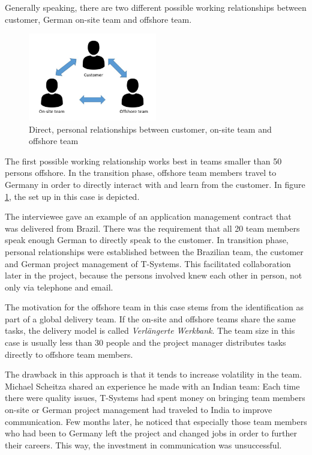 Generally speaking, there are two different possible working relationships between customer, German on-site team and offshore team. %

\vspace{3mm}
\begin{figure}[htbp]
	\centering
	\includegraphics[width=0.5\textwidth]{Pictures/1on1_relationship}
	\caption{Direct, personal relationships between customer, on-site team and offshore team}
	\label{fig:1on1}
\end{figure}

The first possible working relationship works best in teams smaller than 50 persons offshore. In the transition phase, offshore team members travel to Germany in order to directly interact with and learn from the customer. In figure \ref{fig:1on1}, the set up in this case is depicted.

The interviewee gave an example of an application management contract that was delivered from Brazil. There was the requirement that all 20 team members speak enough German to directly speak to the customer. In transition phase, personal relationships were established between the Brazilian team, the customer and German project management of T-Systems. This facilitated collaboration later in the project, because the persons involved knew each other in person, not only via telephone and email.

The motivation for the offshore team in this case stems from the identification as part of a global delivery team. If the on-site and offshore teams share the same tasks, the delivery model is called \textit{Verl\"angerte Werkbank}. The team size in this case is usually less than 30 people and the project manager distributes tasks directly to offshore team members. 

The drawback in this approach is that it tends to increase volatility in the team. Michael Scheitza shared an experience he made with an Indian team: Each time there were quality issues, T-Systems had spent money on bringing team members on-site or German project management had traveled to India to improve communication. Few months later, he noticed that especially those team members who had been to Germany left the project and changed jobs in order to further their careers. This way, the investment in communication was unsuccessful.

